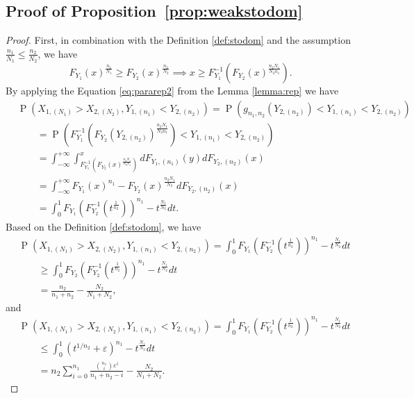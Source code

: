 \documentclass[12pt]{article}
\DeclareMathOperator*{\Prob}{P}
\begin{document}
\subsection{Proof of Proposition~\ref{prop:weakstodom}}

\begin{proof}
First, in combination with the Definition \ref{def:stodom} and the assumption $\frac{n_1}{N_1} \leq \frac{n_2}{N_2}$, we have 
$$
  F_{Y_1}(x)^{\frac{n_1}{N_1}} \geq F_{Y_2}(x)^{\frac{n_2}{N_2}} 
 \implies  
 x \geq F_{Y_1}^{-1}\left(F_{Y_2}(x)^{\frac{n_2N_1}{N_2n_1}}\right).
$$ 
By applying the Equation \ref{eq:pararep2} from the Lemma \ref{lemma:rep} we have 
\begin{align*}
	&\Prob\left(X_{1,(N_1)} > X_{2,(N_2)}, Y_{1,(n_1)} < Y_{2,(n_2)}\right) 
	= \Prob\left( g_{n_1,n_2}\left(Y_{2,(n_2)}\right) < Y_{1,(n_1)}  < Y_{2,(n_2)}\right) \\
	&\qquad = \Prob\left( F_{Y_1}^{-1}\left(F_{Y_2}(Y_{2,(n_2)})^{\frac{n_2N_1}{N_2n_1}}\right) < Y_{1,(n_1)}  < Y_{2,(n_2)}\right) \\
	&\qquad = \int_{-\infty}^{+\infty} \int_{F_{Y_1}^{-1}\left(F_{Y_2}(x)^{\frac{n_2N_1}{N_2n_1}}\right)}^{x} d F_{Y_1, (n_1)}(y) d F_{Y_2, (n_2)}(x) \\
	&\qquad = \int_{-\infty}^{+\infty} F_{Y_1}(x)^{n_1} - F_{Y_2}(x)^{\frac{n_2N_1}{N_2}}d F_{Y_2, (n_2)}(x)\\
	&\qquad = \int_0^1 F_{Y_1}\left( F_{Y_2}^{-1}(t^{\frac{1}{n_2}}) \right)^{n_1} - t^{\frac{N_1}{N_2}} dt. 
\end{align*}
Based on the Definition \ref{def:stodom}, we have
\begin{align*}
	&\Prob\left(X_{1,(N_1)} > X_{2,(N_2)}, Y_{1,(n_1)} < Y_{2,(n_2)}\right) 
	= \int_0^1 F_{Y_1}\left( F_{Y_2}^{-1}(t^{\frac{1}{n_2}}) \right)^{n_1} - t^{\frac{N_1}{N_2}} dt \\
	&\qquad \geq \int_0^1 F_{Y_2}\left( F_{Y_2}^{-1}(t^{\frac{1}{n_2}}) \right)^{n_1} - t^{\frac{N_1}{N_2}} dt \\
	&\qquad = \frac{n_2}{n_1+n_2} - \frac{N_2}{N_1+N_2},
\end{align*}
and
\begin{align*}
	&\Prob\left(X_{1,(N_1)} > X_{2,(N_2)}, Y_{1,(n_1)} < Y_{2,(n_2)}\right) 
	= \int_0^1 F_{Y_1}\left( F_{Y_2}^{-1}(t^{\frac{1}{n_2}}) \right)^{n_1} - t^{\frac{N_1}{N_2}} dt \\
	&\qquad \leq \int_0^1 \left(t^{1/n_2} + \varepsilon\right)^{n_1} - t^{\frac{N_1}{N_2}} dt\\
	&\qquad = n_2\sum_{i=0}^{n_1} \frac{{n_1 \choose i}\varepsilon^i}{n_1+n_2-i}- \frac{N_2}{N_1 + N_2}.
\end{align*}
\end{proof}
\end{document}

